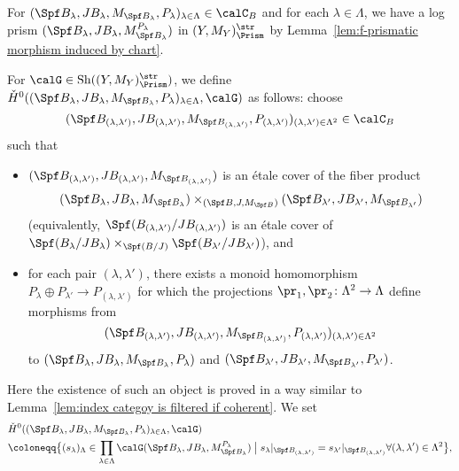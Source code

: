 For $(\Spf B_\lambda, JB_\lambda, M_{\Spf B_\lambda}, P_\lambda)_{\lambda\in \Lambda}\in \calC_B$ and for each $\lambda\in \Lambda$, we have a log prism $(\Spf B_{\lambda},JB_{\lambda}, M_{\Spf B_\lambda}^{P_\lambda})$ in $(Y, M_Y)_{\Prism}^{\str}$ by Lemma~\ref{lem:f-prismatic morphism induced by chart}. 

\begin{defn}\label{defn:0th cech for prismatic functoriality}
For $\calG\in \operatorname{Sh}((Y,M_Y)_\Prism^{\str})$, we define $\check{H}^0((\Spf B_\lambda, JB_\lambda, M_{\Spf B_\lambda}, P_\lambda)_{\lambda\in \Lambda},\calG)$ as follows: choose 
\[
(\Spf B_{(\lambda,\lambda')}, JB_{(\lambda,\lambda')}, M_{\Spf B_{(\lambda,\lambda')}}, P_{(\lambda,\lambda')})_{(\lambda,\lambda')\in \Lambda^2}\in \calC_B
\]
such that
\begin{itemize}
    \item $(\Spf B_{(\lambda,\lambda')}, JB_{(\lambda,\lambda')}, M_{\Spf B_{(\lambda,\lambda')}})$ is an \'etale cover of the fiber product
    \[
    (\Spf B_\lambda, JB_\lambda, M_{\Spf B_\lambda})\times_{(\Spf B, J, M_{\Spf B})}(\Spf B_{\lambda'}, JB_{\lambda'}, M_{\Spf B_{\lambda'}})
    \]
    (equivalently, $\Spf (B_{(\lambda,\lambda')}/JB_{(\lambda,\lambda')})$ is an \'etale cover of $\Spf (B_\lambda/JB_\lambda) \times_{\Spf (B/J)}\Spf (B_{\lambda'}/JB_{\lambda'})$), and 
    \item for each pair $(\lambda,\lambda')$, there exists a monoid homomorphism $P_\lambda\oplus P_{\lambda'}\rightarrow P_{(\lambda,\lambda')}$ for which the projections $\pr_1, \pr_2\colon \Lambda^2\rightarrow \Lambda$ define morphisms from 
    \[
    (\Spf B_{(\lambda,\lambda')}, JB_{(\lambda,\lambda')}, M_{\Spf B_{(\lambda,\lambda')}}, P_{(\lambda,\lambda')})_{(\lambda,\lambda')\in \Lambda^2}
    \]
    to $(\Spf B_\lambda, JB_\lambda, M_{\Spf B_\lambda}, P_\lambda)$ and $(\Spf B_{\lambda'}, JB_{\lambda'}, M_{\Spf B_{\lambda'}}, P_{\lambda'})$.
\end{itemize}
Here the existence of such an object is proved in a way similar to Lemma~\ref{lem:index categoy is filtered if coherent}. We set
\begin{align*}
&\check{H}^0((\Spf B_\lambda, JB_\lambda, M_{\Spf B_\lambda}, P_\lambda)_{\lambda\in \Lambda},\calG)\\
&\coloneqq \bigl\{(s_\lambda)_{\Lambda}\in \prod_{\lambda\in \Lambda}\calG(\Spf B_{\lambda},JB_{\lambda}, M_{\Spf B_\lambda}^{P_\lambda})\bigm| s_\lambda|_{\Spf B_{(\lambda,\lambda')}}=s_{\lambda'}|_{\Spf B_{(\lambda,\lambda')}} \forall (\lambda,\lambda')\in \Lambda^2\bigr\},

\end{align*}
\end{defn}
